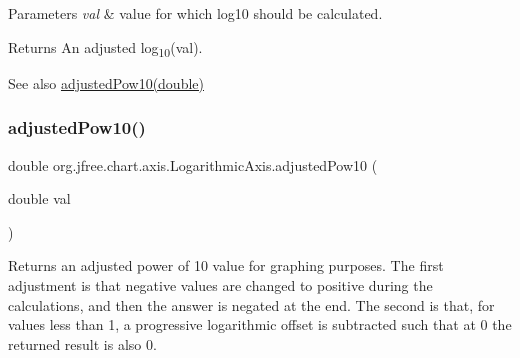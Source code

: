 \begin{DoxyParams}{Parameters}
{\em val} & value for which log10 should be calculated.\\
\hline
\end{DoxyParams}
\begin{DoxyReturn}{Returns}
An adjusted log\textsubscript{10}(val).
\end{DoxyReturn}
\begin{DoxySeeAlso}{See also}
\mbox{\hyperlink{classorg_1_1jfree_1_1chart_1_1axis_1_1_logarithmic_axis_a4b3766f7c120bb78b2a3d52edc0f1ad9}{adjusted\+Pow10(double)}} 
\end{DoxySeeAlso}
\mbox{\label{classorg_1_1jfree_1_1chart_1_1axis_1_1_logarithmic_axis_a4b3766f7c120bb78b2a3d52edc0f1ad9}} 
\subsubsection{\texorpdfstring{adjusted\+Pow10()}{adjustedPow10()}}
{\footnotesize\ttfamily double org.\+jfree.\+chart.\+axis.\+Logarithmic\+Axis.\+adjusted\+Pow10 (\begin{DoxyParamCaption}\item[{double}]{val }\end{DoxyParamCaption})}

Returns an adjusted power of 10 value for graphing purposes. The first adjustment is that negative values are changed to positive during the calculations, and then the answer is negated at the end. The second is that, for values less than 1, a progressive logarithmic offset is subtracted such that at 0 the returned result is also 0.


